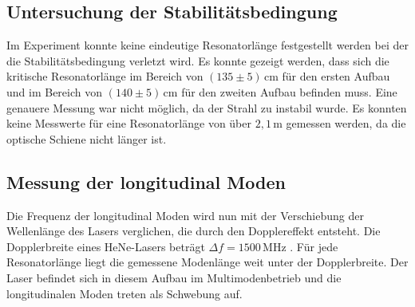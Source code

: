 \subsection{Untersuchung der Stabilitätsbedingung}
\label{sec:Stab_be}
Im Experiment konnte keine eindeutige Resonatorlänge festgestellt werden bei der die Stabilitätsbedingung verletzt wird.
Es konnte gezeigt werden, dass sich die kritische Resonatorlänge im Bereich von $ \left( 135 \pm 5 \right) \, \unit{\centi\meter}$ für den ersten Aufbau und im Bereich von
$ \left( 140 \pm 5 \right) \, \unit{\centi\meter}$ für den zweiten Aufbau befinden muss. Eine genauere Messung war nicht möglich, da der Strahl zu instabil wurde.
Es konnten keine Messwerte für eine Resonatorlänge von über $2,1 \, \unit{\meter}$ gemessen werden, da die optische Schiene nicht länger ist.

\subsection{Messung der longitudinal Moden}
\label{sec:Stab_be}

Die Frequenz der longitudinal Moden wird nun mit der Verschiebung der Wellenlänge des Lasers verglichen, die durch den Dopplereffekt entsteht.
Die Dopplerbreite eines HeNe-Lasers beträgt $ \Delta f = 1500 \, \unit{\mega\hertz}$ \cite{eicheich}. Für jede Resonatorlänge liegt die gemessene Modenlänge weit unter der Dopplerbreite.
Der Laser befindet sich in diesem Aufbau im Multimodenbetrieb und die longitudinalen Moden treten als Schwebung auf.
